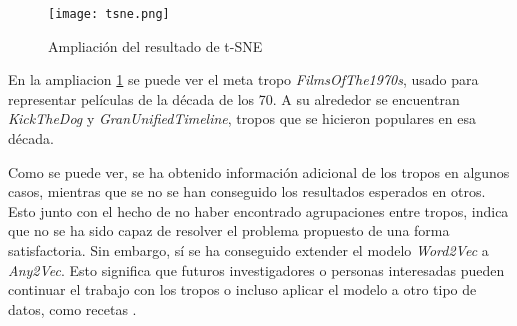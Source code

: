 \begin{figure}\label{ampliacion_fecha}
  \texttt{[image: tsne.png]}
  \centering
  \caption{Ampliación del resultado de t-SNE}
\end{figure}

En la ampliacion \ref{ampliacion_fecha} se puede ver el meta tropo \textit{FilmsOfThe1970s}, usado para representar películas de la década de los 70. A su alrededor se encuentran
\textit{KickTheDog} y \textit{GranUnifiedTimeline}, tropos que se hicieron populares en esa década.

Como se puede ver, se ha obtenido información adicional de los tropos en algunos casos, mientras que se no se han conseguido los resultados esperados en otros.
Esto junto con el hecho de no haber encontrado agrupaciones entre tropos, indica que no se ha sido capaz
de resolver el problema propuesto de una forma satisfactoria. Sin embargo, sí se ha conseguido extender el modelo \textit{Word2Vec} a \textit{Any2Vec}. Esto significa
que futuros investigadores o personas interesadas pueden continuar el trabajo con los tropos o incluso aplicar el modelo a otro tipo de datos, como recetas \cite{kazama2018neural}.